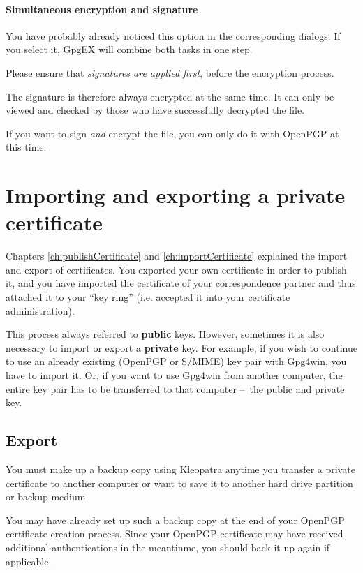 \documentclass[a4paper,11pt,oneside,openright,titlepage]{scrbook}
\begin{document}
\subsubsection{Simultaneous encryption and signature}

You have probably already noticed this option in the corresponding
dialogs. If you select it, GpgEX will combine both tasks in one step.

Please ensure that {\em signatures are applied first}, before the
encryption process.

The signature is therefore always encrypted at the same time. It can
only be viewed and checked by those who have successfully decrypted
the file.

If you want to sign \textit{and} encrypt the file, you can only do it
with OpenPGP at this time.



\clearpage
\chapter{Importing and exporting a private certificate}
\label{ch:ImExport}

Chapters \ref{ch:publishCertificate} and \ref{ch:importCertificate}
explained the import and export of certificates. You exported your own
certificate in order to publish it, and you have imported the
certificate of your correspondence partner and thus attached it to
your ``key ring'' (i.e. accepted it into your
certificate administration).

This process always referred to \textbf{public} keys. However,
sometimes it is also necessary to import or export a \textbf{private}
key. For example, if you wish to continue to use an already existing
(OpenPGP or S/MIME) key pair with Gpg4win, you have to import it. Or,
if you want to use Gpg4win from another computer, the entire key pair
has to be transferred to that computer  --~the public and private
key.

\clearpage
\section{Export}

You must make up a backup copy using Kleopatra anytime you transfer a
private certificate to another computer or want to save it to another
hard drive partition or backup medium.

You may have already set up such a backup copy at the end of your
OpenPGP certificate creation process. Since your OpenPGP certificate
may have received additional authentications in the meantinme, you
should back it up again if applicable.
\end{document}
